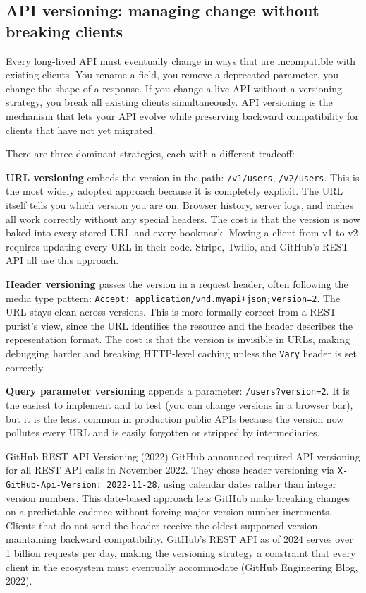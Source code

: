 \documentclass[11pt,a4paper]{article}
\begin{document}
\subsection{API versioning: managing change without breaking clients}

Every long-lived API must eventually change in ways that are incompatible with existing clients. You rename a field, you remove a deprecated parameter, you change the shape of a response. If you change a live API without a versioning strategy, you break all existing clients simultaneously. API versioning is the mechanism that lets your API evolve while preserving backward compatibility for clients that have not yet migrated.

There are three dominant strategies, each with a different tradeoff:

\textbf{URL versioning} embeds the version in the path: \texttt{/v1/users}, \texttt{/v2/users}. This is the most widely adopted approach because it is completely explicit. The URL itself tells you which version you are on. Browser history, server logs, and caches all work correctly without any special headers. The cost is that the version is now baked into every stored URL and every bookmark. Moving a client from v1 to v2 requires updating every URL in their code. Stripe, Twilio, and GitHub's REST API all use this approach.

\textbf{Header versioning} passes the version in a request header, often following the media type pattern: \texttt{Accept: application/vnd.myapi+json;version=2}. The URL stays clean across versions. This is more formally correct from a REST purist's view, since the URL identifies the resource and the header describes the representation format. The cost is that the version is invisible in URLs, making debugging harder and breaking HTTP-level caching unless the \texttt{Vary} header is set correctly.

\textbf{Query parameter versioning} appends a parameter: \texttt{/users?version=2}. It is the easiest to implement and to test (you can change versions in a browser bar), but it is the least common in production public APIs because the version now pollutes every URL and is easily forgotten or stripped by intermediaries.

\begin{industrybox}{GitHub REST API Versioning (2022)}
GitHub announced required API versioning for all REST API calls in November 2022. They chose header versioning via \texttt{X-GitHub-Api-Version: 2022-11-28}, using calendar dates rather than integer version numbers. This date-based approach lets GitHub make breaking changes on a predictable cadence without forcing major version number increments. Clients that do not send the header receive the oldest supported version, maintaining backward compatibility. GitHub's REST API as of 2024 serves over 1 billion requests per day, making the versioning strategy a constraint that every client in the ecosystem must eventually accommodate (GitHub Engineering Blog, 2022).
\end{industrybox}
\end{document}
